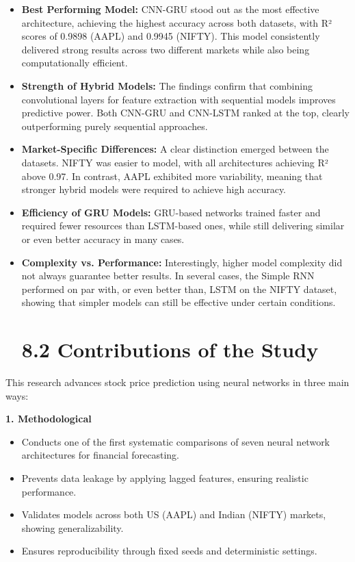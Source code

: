 \documentclass[12pt,a4paper]{report}
\begin{document}
\begin{itemize}
  \item \textbf{Best Performing Model:} CNN-GRU stood out as the most effective architecture, achieving the highest accuracy across both datasets, with R² scores of 0.9898 (AAPL) and 0.9945 (NIFTY). This model consistently delivered strong results across two different markets while also being computationally efficient.
  \item \textbf{Strength of Hybrid Models:} The findings confirm that combining convolutional layers for feature extraction with sequential models improves predictive power. Both CNN-GRU and CNN-LSTM ranked at the top, clearly outperforming purely sequential approaches.
  \item \textbf{Market-Specific Differences:} A clear distinction emerged between the datasets. NIFTY was easier to model, with all architectures achieving R² above 0.97. In contrast, AAPL exhibited more variability, meaning that stronger hybrid models were required to achieve high accuracy.
  \item \textbf{Efficiency of GRU Models:} GRU-based networks trained faster and required fewer resources than LSTM-based ones, while still delivering similar or even better accuracy in many cases.
  \item \textbf{Complexity vs. Performance:} Interestingly, higher model complexity did not always guarantee better results. In several cases, the Simple RNN performed on par with, or even better than, LSTM on the NIFTY dataset, showing that simpler models can still be effective under certain conditions.
\section{8.2 Contributions of the Study}
\end{itemize}

This research advances stock price prediction using neural networks in three main ways:

\textbf{1. Methodological}

\begin{itemize}
  \item Conducts one of the first systematic comparisons of seven neural network architectures for financial forecasting.
  \item Prevents data leakage by applying lagged features, ensuring realistic performance.
  \item Validates models across both US (AAPL) and Indian (NIFTY) markets, showing generalizability.
  \item Ensures reproducibility through fixed seeds and deterministic settings.
\end{itemize}
\end{document}
